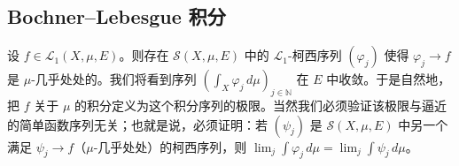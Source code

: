 \subsection*{Bochner–Lebesgue 积分}

设 $ f \in \mathcal{L}_1(X,\mu,E) $。则存在 $ \mathcal{S}(X,\mu,E) $ 中的 $ \mathcal{L}_1 $-柯西序列 $ (\varphi_j) $ 使得 $ \varphi_j \to f $ 是 $ \mu $-几乎处处的。我们将看到序列 $ \left( \int_X \varphi_j \, d\mu \right)_{j \in \mathbb{N}} $ 在 $ E $ 中收敛。于是自然地，把 $ f $ 关于 $ \mu $ 的积分定义为这个积分序列的极限。当然我们必须验证该极限与逼近的简单函数序列无关；也就是说，必须证明：若 $ (\psi_j) $ 是 $ \mathcal{S}(X,\mu,E) $ 中另一个满足 $ \psi_j \to f $（$ \mu $-几乎处处）的柯西序列，则 $ \lim_j \int \varphi_j \, d\mu = \lim_j \int \psi_j \, d\mu $。

